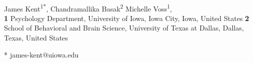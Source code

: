 \documentclass[10pt,letterpaper]{article}
\begin{document}
\vspace*{0.2in}

\begin{flushleft}
{\Large
\textbf{} %
}
\newline
\\
James Kent\textsuperscript{1*},
Chandramallika Basak\textsuperscript{2}
Michelle Voss\textsuperscript{1},
\\
\bigskip
\textbf{1} Psychology Department, University of Iowa, Iowa City, Iowa, United States
\textbf{2} School of Behavioral and Brain Science, University of Texas at Dallas, Dallas, Texas, United States
\bigskip

% 
%





* james-kent@uiowa.edu

\end{flushleft}
\end{document}
